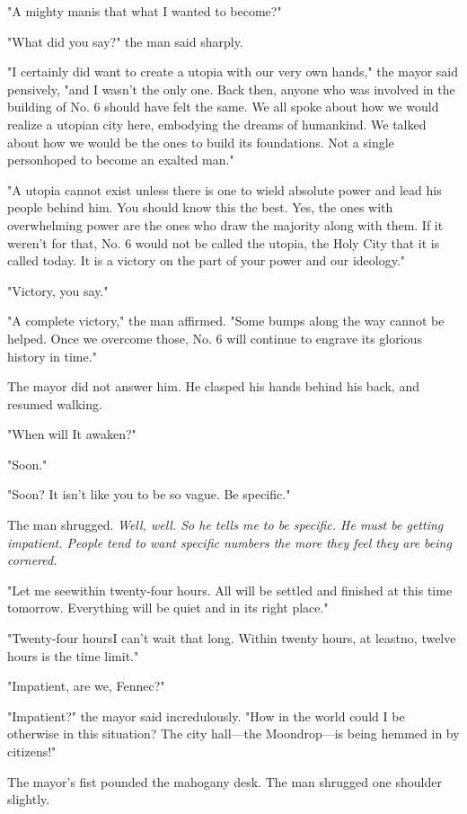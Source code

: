 "A mighty man\el is that what I wanted to become?"

"What did you say?" the man said sharply.

"I certainly did want to create a utopia with our very own hands," the
mayor said pensively, "and I wasn't the only one. Back then, anyone who
was involved in the building of No. 6 should have felt the same. We all
spoke about how we would realize a utopian city here, embodying the
dreams of humankind. We talked about how we would be the ones to build
its foundations. Not a single person\el hoped to become an exalted man."

"A utopia cannot exist unless there is one to wield absolute power and
lead his people behind him. You should know this the best. Yes, the ones
with overwhelming power are the ones who draw the majority along with
them. If it weren't for that, No. 6 would not be called the utopia, the
Holy City that it is called today. It is a victory on the part of your
power and our ideology."

"Victory, you say."

"A complete victory," the man affirmed. "Some bumps along the way cannot
be helped. Once we overcome those, No. 6 will continue to engrave its
glorious history in time."

The mayor did not answer him. He clasped his hands behind his back, and
resumed walking.

"When will It awaken?"

"Soon."

"Soon? It isn't like you to be so vague. Be specific."

The man shrugged. \emph{Well, well. So he tells me to be specific. He must be
getting impatient. People tend to want specific numbers the more they
feel they are being cornered.}

"Let me see\el within twenty-four hours. All will be settled and
finished at this time tomorrow. Everything will be quiet and in its
right place."

"Twenty-four hours\el I can't wait that long. Within twenty hours, at
least\el no, twelve hours is the time limit."

"Impatient, are we, Fennec?"

"Impatient?" the mayor said incredulously. "How in the world could I be
otherwise in this situation? The city hall---the Moondrop---is being hemmed
in by citizens!"

The mayor's fist pounded the mahogany desk. The man shrugged one
shoulder slightly.

